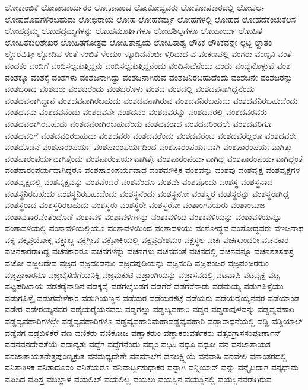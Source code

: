 {ಲೋಕಾಂಬಿಕೆ
ಲೋಕಾಚಾರ್ಯರರ
ಲೋಕಾನಾಂಚ
ಲೋಕೋದ್ಭವರು
ಲೋಕೋಪಕಾರದಲ್ಲಿ
ಲೋಚೆರ್ಲ
ಲೋಪದೊಷಗಳಿರಬಹುದು
ಲೋಭಿರಾಯ
ಲೋಹ
ಲೋಹಕರ್ಮ್ಮ
ಲೋಹಗಳಲ್ಲಿ
ಲೋಹದ
ಲೋಹದಕಂಚುಕೆಲಸ
ಲೋಹದ್ರಮ್ಮ
ಲೋಹದ್ರಮ್ಮಗಳನ್ನು
ಲೋಹಮೂರ್ತಿಗಳೂ
ಲೋಹಶಿಲ್ಪಗಳೂ
ಲೋಹಾರ್ಯ
ಲೋಹಿತ
ಲೋಹಿತಕುಲಶೇಖರ
ಲೋಹಿತಗೋತ್ರದ
ಲೋಹಿತಾನ್ವಯ
ಲೋಹಿತಾಶ್ವ
ಲೌಕಿಕ
ಲೌಕಿಕವನ್ನೇ
ಲ್ಗಟ್ಟ
ಲ್ದಾತಂ
ಲ್ದೊರೆವಿತ್ತೀ
ಲ್ದೋದಿಪ
ಳಂತೆ
ಳಂಬಿತ
ಳೆಂದುಂ
ಳ್ಕೂಡಿದನೆಂಬೀ
ಳ್ತಿರಿದುದ
ವ
ವಂಕಣಪಲ್ಲಿ
ವಂಗರು
ವಂಣ್ಪನಿ
ವಂತೆ
ವಂದಕಂ
ವಂದಿಗೆ
ವಂದಿಸಲ್ಪಡುತ್ತಿದ್ದನು
ವಂದಿಸಲ್ಪಡುತ್ತಿದ್ದನೆಂದು
ವಂದಿಸುವೆನೆಂದು
ವಂದು
ವಂದ್ಯನೊಳ್ಪುವೆ
ವಂಶ
ವಂಶಕ್ಕೂ
ವಂಶಕ್ಕೆ
ವಂಶಗಳು
ವಂಶಜನಾಗಿದ್ದು
ವಂಶಜನಾಗಿರುವ
ವಂಶಜನಿರಬಹುದೆಂದು
ವಂಶಜನೇ
ವಂಶಜರನ್ನು
ವಂಶಜರಾದ
ವಂಶಜರು
ವಂಶಜರೆಂದು
ವಂಶಜರೊಳು
ವಂಶದ
ವಂಶದಲ್ಲಿ
ವಂಶದವನಾಗಿದ್ದನೆಂದು
ವಂಶದವನಾಗಿದ್ದಾನೆ
ವಂಶದವನಾಗಿರಬಹುದು
ವಂಶದವನಾಗಿರುವ
ವಂಶದವನಿರಬಹುದು
ವಂಶದವನಿರಬಹುದೆಂದು
ವಂಶದವನು
ವಂಶದವನೆಂದು
ವಂಶದವನೇ
ವಂಶದವರ
ವಂಶದವರನ್ನು
ವಂಶದವರಲ್ಲಿ
ವಂಶದವರವರು
ವಂಶದವರಾಗಿರಬಹುದು
ವಂಶದವರಾಗಿರಬಹುದೆಂದು
ವಂಶದವರಾದ
ವಂಶದವರಿಂದಲೇ
ವಂಶದವರಿಗೂ
ವಂಶದವರಿಗೆ
ವಂಶದವರಿರಬಹುದು
ವಂಶದವರು
ವಂಶದವರೆಂದು
ವಂಶದವರೆಂಬ
ವಂಶದವರೆಲ್ಲರೂ
ವಂಶದವರೇ
ವಂಶದೊಡನೆ
ವಂಶಪಾರಂಪರ್ಯ
ವಂಶಪಾರಂಪರ್ಯದಿಂದ
ವಂಶಪಾರಂಪರ್ಯವಾಗಿ
ವಂಶಪಾರಂಪರ್ಯವಾಗಿತ್ತು
ವಂಶಪಾರಂಪರ್ಯವಾಗಿತ್ತೆಂದು
ವಂಶಪಾರಂಪರ್ಯವಾಗಿತ್ತೇ
ವಂಶಪಾರಂಪರ್ಯವಾಗಿದ್ದ
ವಂಶಪಾರಂಪರ್ಯವಾಗಿದ್ದಂತೆ
ವಂಶಪಾರಂಪರ್ಯವಾಗಿದ್ದರೂ
ವಂಶಪಾರಂಪರ್ಯವಾದ
ವಂಶಮೌಕ್ತಿಕ
ವಂಶವನ್ನು
ವಂಶವು
ವಂಶವೃಕ್ಷ
ವಂಶವೃಕ್ಷಗಳ
ವಂಶವೃಕ್ಷದಲ್ಲಿ
ವಂಶವೃಕ್ಷವನ್ನು
ವಂಶವೆಂದರೆ
ವಂಶವೆಂದೂ
ವಂಶವೇ
ವಂಶವೊಂದು
ವಂಶಸ್ಥ
ವಂಶಸ್ಥನಾದ
ವಂಶಸ್ಥನಿರಬಹುದು
ವಂಶಸ್ಥನಿರಬಹುದೆಂದು
ವಂಶಸ್ಥನೆಂದು
ವಂಶಸ್ಥನೋ
ವಂಶಸ್ಥರ
ವಂಶಸ್ಥರನ್ನು
ವಂಶಸ್ಥರಾಗಿದ್ದ
ವಂಶಸ್ಥರಾದ
ವಂಶಸ್ಥರಿರಬಹುದು
ವಂಶಸ್ಥರು
ವಂಶಸ್ಥರೇ
ವಂಶಸ್ಥರೋ
ವಂಶಾಂಗನೆಯರು
ವಂಶಾಂಬುಜ
ವಂಶಾವತಾರವೆಂತೆಂದೊಡೆ
ವಂಶಾವಳಿ
ವಂಶಾವಳಿಗಳನ್ನು
ವಂಶಾವಳಿಯ
ವಂಶಾವಳಿಯನ್ನು
ವಂಶಾವಳಿಯನ್ನೂ
ವಂಶಾವಳಿಯಲ್ಲಿ
ವಂಶಾವಳಿಯಲ್ಲಿಯೂ
ವಂಶಾವಳಿಯಿಂದ
ವಂಶಾವಳಿಯು
ವಂಶೋದ್ಭವ
ವಂಶೋದ್ಭವರು
ವಇಜನಾಥ
ವಕ್ತೃ
ವಕ್ತೃಪ್ರಯೋಕ್ತೃ
ವಕ್ತ್ರಾಬ್ಜ
ವಕ್ರಗ್ರೀವ
ವಕ್ರೋಕ್ತಿಯಲ್ಲಿ
ವಕ್ಷಪ್ರದೇಶಮಂ
ವಕ್ಷಸ್ಥಲ
ವಚಃ
ವಚಃಸುಂದರೀ
ವಚನಕಾರ
ವಚನಕಾರರಾಗಿದ್ದ
ವಚನಕಾರರೂ
ವಚನಗಳನ್ನು
ವಚನಗಳು
ವಚನದಂತೆ
ವಚನದಲ್ಲಿ
ವಚನವನ್ನೂ
ವಚನಶತಸಹಸ್ರ
ವಚೋ
ವಜ್ಜಲದೇವ
ವಜ್ರದ
ವಜ್ರದಂಡನುಂ
ವಜ್ರದಪುಡಿಯನ್ನು
ವಜ್ರನಂದಿ
ವಜ್ರಪಂಜರ
ವಜ್ರಪಂಜರರುಂ
ವಜ್ರಪ್ರಾಕಾರನೂ
ವಜ್ರಬೈಸಣಿಗೆಯನಿಕ್ಕಿ
ವಜ್ರಮಕುಟಿ
ವಜ್ರಾಂಗಿಯನ್ನು
ವಜ್ರಾಸನದಲ್ಲಿ
ವಟವಾಪಿ
ವಟವೃಕ್ಷ
ವಟ್ಟ
ವಟ್ಟಪರಿಖಾಯ
ವಡಕರೈನಾಡಿನ
ವಡಕ್ಕರೈ
ವಡಗಲೈಬಡಗ
ವಡಗೆರೆ
ವಡಗೆರೆನಾಡು
ವಡಮಯ್ಯ
ವಡುಗಪಿಳ್ಳೆಯು
ವಡುಗಪಿಳ್ಳೈ
ವಡುಗವೇಳೆಕಾರ
ವಡುಗಿಯಣ್ಣನ
ವಡೆಯರ
ವಡೆಯರಕಟ್ಟೆ
ವಡೆಯರು
ವಡೆಯರೈಯ್ಯನವರ
ವಡೆಯಾಂಡ
ವಡೇರ
ವಡೇರಯ್ಯನವರ
ವಡೈಯರೈಯನವರು
ವಡ್ಡಗಲ್ಲು
ವಡ್ಡಬ್ಯವಹಾರಿ
ವಡ್ಡರ
ವಡ್ಡರಾವುಳವನ್ನು
ವಡ್ಡವ್ಯವಹಾರಿ
ವಡ್ಡವ್ಯವಹಾರಿಗಳಲ್ಲೇ
ವಡ್ಡವ್ಯವಹಾರಿಗಳೂ
ವಡ್ಡವ್ಯವಹಾರಿಮಹಾವಡ್ಡವ್ಯವಹಾರಿ
ವಡ್ಡಾರಾಧನೆಯಲ್ಲಿ
ವಡ್ಡಿ
ವಡ್ಡಿಯಾಲ್
ವಡ್ನೆನಗ
ವಡ್ರಬಿಳಿಕೆರೆ
ವಣ
ವಣಿಕರು
ವಣಿಕೋಜ
ವಣ್ಣಾಕರುಂ
ವಣ್ಣಾಕರುವರ್ತಕರು
ವತ್ಸರಗ್ರಾಸಸಂಪೂರ್ಣಾನ್
ವದನವನದೇವತೆಯೆ
ವದಾನ್ಯತಃ
ವದ್ದೆಗ
ವದ್ದೆಗನೆಂದು
ವದ್ಯಂ
ವಧಿಸಿ
ವಧೂ
ವಧೂಃ
ವನ
ವನಜಾತಾಯತ
ವನಜಾತಾಯತನೇತ್ರಪುಂಣ್ಯಕ್ರುತ
ವನಮಧ್ಯದೇಶೇ
ವನಮಾಲೆಗೆ
ವನಲಕ್ಷ್ಮಿಯೆ
ವನವಾಸಿ
ವನವೇಲಿ
ವನಾಂತರದಲ್ಲಿ
ವನಿತಾತಿಳಕ
ವನಿತಾದೂರಂ
ವನಿತೆಯರೊ
ವನಿವಾರ್ದ್ಧಿಸುಧಾಕರ
ವನ್ನಾಗಿ
ವನ್ನಿಯಾರ್
ವನ್ನು
ವನ್ನೈದಿದಾಗ
ವನ್ಯಧಾಮ
ವಪಿಸಿದ
ವಪಿಸ್ತ
ವಬಲ್ಲಾಳ
ವಯಲಿಲ್
ವಯಲಿಲ್ಲ
ವಯಲು
ವಯಸ್ಸಿನ
ವಯಸ್ಸಿನಲ್ಲಿ
ವಯಸ್ಸಿನವರಾಗಿರುವ
}
